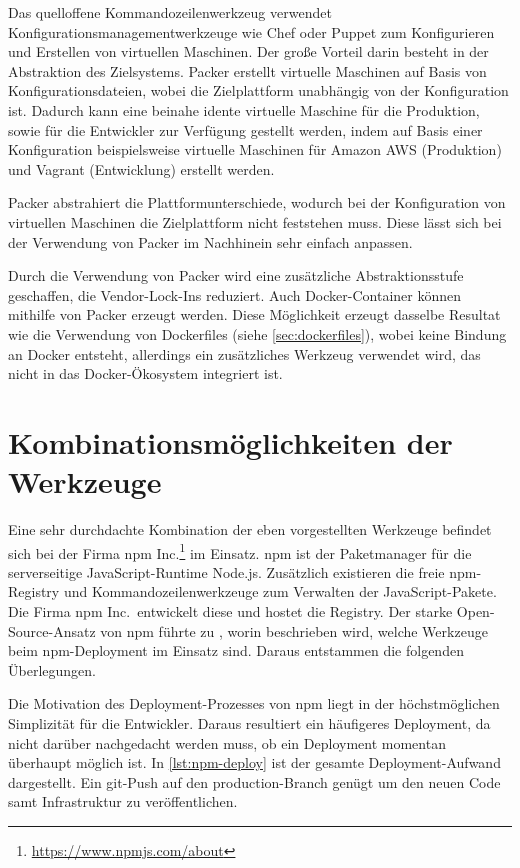Das quelloffene Kommandozeilenwerkzeug verwendet Konfigurationsmanagementwerkzeuge wie Chef oder Puppet zum Konfigurieren und Erstellen von virtuellen Maschinen.
Der große Vorteil darin besteht in der Abstraktion des Zielsystems.
Packer erstellt virtuelle Maschinen auf Basis von Konfigurationsdateien, wobei die Zielplattform unabhängig von der Konfiguration ist.
Dadurch kann eine beinahe idente virtuelle Maschine für die Produktion, sowie für die Entwickler zur Verfügung gestellt werden, indem auf Basis einer Konfiguration beispielsweise virtuelle Maschinen für Amazon AWS (Produktion) und Vagrant (Entwicklung) erstellt werden.

Packer abstrahiert die Plattformunterschiede, wodurch bei der Konfiguration von virtuellen Maschinen die Zielplattform nicht feststehen muss.
Diese lässt sich bei der Verwendung von Packer im Nachhinein sehr einfach anpassen.

Durch die Verwendung von Packer wird eine zusätzliche Abstraktionsstufe geschaffen, die Vendor-Lock-Ins reduziert.
Auch Docker-Container können mithilfe von Packer erzeugt werden.
Diese Möglichkeit erzeugt dasselbe Resultat wie die Verwendung von Dockerfiles (siehe \cref{sec:dockerfiles}), wobei keine Bindung an Docker entsteht, allerdings ein zusätzliches Werkzeug verwendet wird, das nicht in das Docker-Ökosystem integriert ist.


\section{Kombinationsmöglichkeiten der Werkzeuge}
\label{sec:werkzeugkombinationsmoeglichkeiten}
Eine sehr durchdachte Kombination der eben vorgestellten Werkzeuge befindet sich bei der Firma npm Inc.\footnote{\url{https://www.npmjs.com/about}} im Einsatz.
npm ist der Paketmanager für die serverseitige JavaScript-Runtime Node.js.
Zusätzlich existieren die freie npm-Registry und Kommandozeilenwerkzeuge zum Verwalten der JavaScript-Pakete.
Die Firma npm Inc.\ entwickelt diese und hostet die Registry.
Der starke Open-Source-Ansatz von npm führte zu \autocite{npm-deployment:online}, worin beschrieben wird, welche Werkzeuge beim npm-Deployment im Einsatz sind. Daraus entstammen die folgenden Überlegungen.


Die Motivation des Deployment-Prozesses von npm liegt in der höchstmöglichen Simplizität für die Entwickler.
Daraus resultiert ein häufigeres Deployment, da nicht darüber nachgedacht werden muss, ob ein Deployment momentan überhaupt möglich ist.
In \cref{lst:npm-deploy} ist der gesamte Deployment-Aufwand dargestellt.
Ein git-Push auf den production-Branch genügt um den neuen Code samt Infrastruktur zu veröffentlichen.

